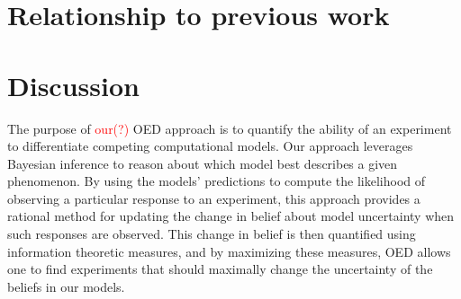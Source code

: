 \documentclass{article}
\newcommand{\red}[1]{\textcolor{Red}{#1}}
\begin{document}
\section{Relationship to previous work}
\section{Discussion}

The purpose of \red{our(?)} OED approach is to quantify the ability of an experiment to differentiate competing computational models. Our approach leverages Bayesian inference to reason about which model best describes a given phenomenon. By using the models' predictions to compute the likelihood of observing a particular response to an experiment, this approach provides a rational method for updating the change in belief about model uncertainty when such responses are observed. This change in belief is then quantified using information theoretic measures, and by maximizing these measures, OED allows one to find experiments that should maximally change the uncertainty of the beliefs in our models.

%
%
\end{document}
